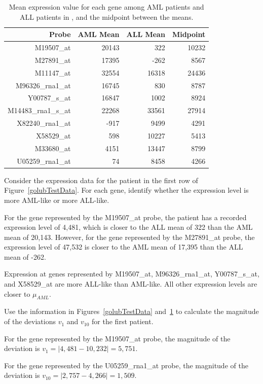 \begin{table}[h]
	\centering
	\begin{tabular}{r|r|r|r}
		\hline
		Probe & AML Mean & ALL Mean & Midpoint \\ 
		\hline
		M19507\_at & 20143 & 322 & 10232 \\ 
		M27891\_at & 17395 & -262 & 8567 \\ 
		M11147\_at & 32554 & 16318 & 24436 \\ 
		M96326\_rna1\_at & 16745 & 830 & 8787 \\ 
		Y00787\_s\_at & 16847 & 1002 & 8924 \\ 
		M14483\_rna1\_s\_at & 22268 & 33561 & 27914 \\ 
		X82240\_rna1\_at & -917 & 9499 & 4291 \\ 
		X58529\_at & 598 & 10227 & 5413 \\ 
		M33680\_at & 4151 & 13447 & 8799 \\ 
		U05259\_rna1\_at & 74 & 8458 & 4266 \\ 
		\hline
	\end{tabular}
	\caption{Mean expression value for each gene among AML patients and ALL patients in , and the midpoint between the means. \label{golubTrainMeansMidpoints}}
\end{table}

\begin{examplewrap}
\begin{nexample}{Consider the expression data for the patient in the first row of Figure~\ref{golubTestData}. For each gene, identify whether the expression level is more AML-like or more ALL-like.}
	
For the gene represented by the M19507\_at probe, the patient has a recorded expression level of 4,481, which is closer to the ALL mean of 322 than the AML mean of 20,143. However, for the gene represented by the M27891\_at probe, the expression level of 47,532 is closer to the AML mean of 17,395 than the ALL mean of -262. 

Expression at genes represented by M19507\_at, M96326\_rna1\_at, Y00787\_s\_at, and X58529\_at are more ALL-like than AML-like. All other expression levels are closer to $\mu_{AML}$.
\end{nexample}
\end{examplewrap}

\begin{examplewrap}
\begin{nexample}{Use the information in Figures~\ref{golubTestData} and~\ref{golubTrainMeansMidpoints} to calculate the magnitude of the deviations $v_1$ and $v_{10}$ for the first patient.}
	
For the gene represented by the M19507\_at probe, the magnitude of the deviation is $v_1 = |4,481 - 10,232| = 5,751$.	

For the gene represented by the U05259\_rna1\_at probe, the magnitude of the deviation is $v_{10} = |2,757 - 4,266| = 1,509$.
\end{nexample}
\end{examplewrap}	

